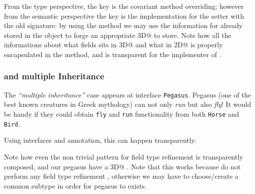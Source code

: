 From the type perspective, the key is the covariant method overriding; however from the semantic perspective the key is the implementation for the setter with the old signature:
by using the \Q@with@ method we may use the information for \Q@z@ already stored in the object to forge an appropriate \Q@Point3D@ to store.
Note how all the informations about what fields sits in \Q@Point3D@ and what in \Q@Point2D@ is properly encapsulated in the \Q@with@ method, and is transparent for the implementer of \Q@Bird@.

\subsubsection{\Q@Pegasus@ and multiple Inheritance}
The \emph{``multiple inheritance''} case appears at interface
\texttt{Pegasus}.
Pegasus (one of the best known creatures
in Greek mythology) can not only \emph{run} but also \emph{fly}! 
It would be handy if they could obtain \texttt{fly} and \texttt{run} functionality from both \texttt{Horse} and \texttt{Bird}.

 Using interfaces and \mixin annotation,
this can happen transparently.


Note how  even the non trivial pattern for field type refinement is transparently composed, and our pegasus have a \Q@Point3D@ \Q@location@.
Note that this works because \Q@Horse@ do not perform any field type refinement , otherwise we may have to choose/create a common subtype in order for pegasus to exists.


